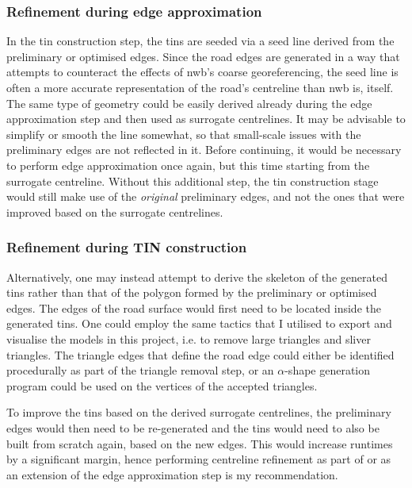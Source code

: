 \subsubsection{Refinement during edge approximation}

In the \ac{tin} construction step, the \ac{tin}s are seeded via a seed line derived from the preliminary or optimised edges. Since the road edges are generated in a way that attempts to counteract the effects of \ac{nwb}'s coarse georeferencing, the seed line is often a more accurate representation of the road's centreline than \ac{nwb} is, itself. The same type of geometry could be easily derived already during the edge approximation step and then used as surrogate centrelines. It may be advisable to simplify or smooth the line somewhat, so that small-scale issues with the preliminary edges are not reflected in it. Before continuing, it would be necessary to perform edge approximation once again, but this time starting from the surrogate centreline. Without this additional step, the \ac{tin} construction stage would still make use of the \textit{original} preliminary edges, and not the ones that were improved based on the surrogate centrelines.

\subsubsection{Refinement during TIN construction}

Alternatively, one may instead attempt to derive the skeleton of the generated \ac{tin}s rather than that of the polygon formed by the preliminary or optimised edges. The edges of the road surface would first need to be located inside the generated \ac{tin}s. One could employ the same tactics that I utilised to export and visualise the models in this project, i.e. to remove large triangles and sliver triangles. The triangle edges that define the road edge could either be identified procedurally as part of the triangle removal step, or an $\alpha$-shape generation program could be used on the vertices of the accepted triangles.

To improve the \ac{tin}s based on the derived surrogate centrelines, the preliminary edges would then need to be re-generated and the \ac{tin}s would need to also be built from scratch again, based on the new edges. This would increase runtimes by a significant margin, hence performing centreline refinement as part of or as an extension of the edge approximation step is my recommendation.

